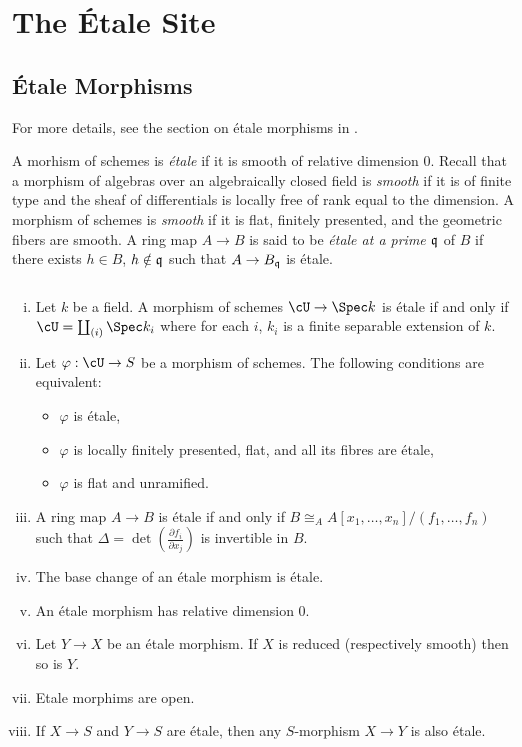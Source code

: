 \section{The \'Etale Site}
\subsection{\'Etale Morphisms}

For more details, see the section on \'etale morphisms in \cite{Stacks}.

\begin{defi}
A morhism of schemes is \emph{\'etale} if it is smooth of relative dimension 0. Recall that a morphism of algebras over an algebraically closed field is \emph{smooth} if it is of finite type and the sheaf of differentials is locally free of rank equal to the dimension. A morphism of schemes is \emph{smooth} if it is flat, finitely presented, and the geometric fibers are smooth. A ring map $A \to B$ is said to be \emph{\'etale at a prime $\frak q$} of $B$ if there exists $h \in B$, $h \notin \frak q$ such that $A \to B_{\frak q}$ is \'etale.
\end{defi}

\begin{prop} $ $ \label{prop:ofEtaleMorphisms}
\begin{enumerate}[i.]
\item
Let $k$ be a field. A morphism of schemes $\cU \to \Spec k$ is \'etale if and only if $\cU = \coprod_{(i)} \Spec k_i$ where for each $i$, $k_i$ is a finite separable extension of $k$.
\item
Let $\varphi : \cU \to S$ be a morphism of schemes. The following conditions are equivalent:  
\begin{itemize}
\item $\varphi$ is \'etale,
\item $\varphi$ is locally finitely presented, flat, and all its fibres are \'etale,
\item $\varphi$ is flat and unramified.
\end{itemize}
\item
A ring map $A \to B$ is \'etale if and only if $B \cong_A A[x_1, \dots,x_n]/(f_1,\dots,f_n)$ such that $\Delta = \det \left( \frac{\partial f_i}{\partial x_j} \right) $ is invertible in $B$.
\item
The base change of an \'etale morphism is \'etale.
\item
An \'etale morphism has relative dimension 0.
\item
Let $Y \to X$ be an \'etale morphism. If  $X$ is reduced (respectively smooth) then so is $Y$.
\item 
Etale morphims are open.
\item
If $X\to S$ and $Y\to S$ are \'etale, then any $S$-morphism $X \to Y$ is also \'etale.
\end{enumerate}
\end{prop}

